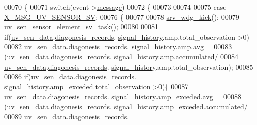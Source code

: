 \begin{DoxyCode}
00070 \{
00071     \textcolor{keywordflow}{switch}(event->\hyperlink{a00036_adf9665938515a20c283eea2c978cf80d}{message})
00072     \{
00073 
00074 
00075         \textcolor{keywordflow}{case} \hyperlink{a00035_a88ce8cfec1a4d1cf613a890254880e24}{X\_MSG\_UV\_SENSOR\_SV}:
00076         \{
00077 
00078             \hyperlink{a00067_a710d148845397582739d170341f3d3d9}{srv\_wdg\_kick}();
00079             uv\_sen\_sensor\_element\_sv\_task();
00080 
00081             \textcolor{keywordflow}{if}(\hyperlink{a00073_adb4cffe9b88704fe686a94fe9996fa52}{uv\_sen\_data}.\hyperlink{a00035_a7ae905b560513ad201e58c2f63375030}{diagonesis\_records}.
      \hyperlink{a00017_affb63906d23cb1cb7787d61eaaedfb60}{signal\_history}.amp.total\_observation >0)
00082                 \hyperlink{a00073_adb4cffe9b88704fe686a94fe9996fa52}{uv\_sen\_data}.\hyperlink{a00035_a7ae905b560513ad201e58c2f63375030}{diagonesis\_records}.
      \hyperlink{a00017_affb63906d23cb1cb7787d61eaaedfb60}{signal\_history}.amp.avg =
00083                         (\hyperlink{a00073_adb4cffe9b88704fe686a94fe9996fa52}{uv\_sen\_data}.\hyperlink{a00035_a7ae905b560513ad201e58c2f63375030}{diagonesis\_records}.
      \hyperlink{a00017_affb63906d23cb1cb7787d61eaaedfb60}{signal\_history}.amp.accumulated/
00084                         \hyperlink{a00073_adb4cffe9b88704fe686a94fe9996fa52}{uv\_sen\_data}.\hyperlink{a00035_a7ae905b560513ad201e58c2f63375030}{diagonesis\_records}.
      \hyperlink{a00017_affb63906d23cb1cb7787d61eaaedfb60}{signal\_history}.amp.total\_observation);
00085 
00086             \textcolor{keywordflow}{if}(\hyperlink{a00073_adb4cffe9b88704fe686a94fe9996fa52}{uv\_sen\_data}.\hyperlink{a00035_a7ae905b560513ad201e58c2f63375030}{diagonesis\_records}.
      \hyperlink{a00017_affb63906d23cb1cb7787d61eaaedfb60}{signal\_history}.amp\_exceded.total\_observation >0)\{
00087                 \hyperlink{a00073_adb4cffe9b88704fe686a94fe9996fa52}{uv\_sen\_data}.\hyperlink{a00035_a7ae905b560513ad201e58c2f63375030}{diagonesis\_records}.
      \hyperlink{a00017_affb63906d23cb1cb7787d61eaaedfb60}{signal\_history}.amp\_exceded.avg =
00088                         (\hyperlink{a00073_adb4cffe9b88704fe686a94fe9996fa52}{uv\_sen\_data}.\hyperlink{a00035_a7ae905b560513ad201e58c2f63375030}{diagonesis\_records}.
      \hyperlink{a00017_affb63906d23cb1cb7787d61eaaedfb60}{signal\_history}.amp\_exceded.accumulated/
00089                         \hyperlink{a00073_adb4cffe9b88704fe686a94fe9996fa52}{uv\_sen\_data}.\hyperlink{a00035_a7ae905b560513ad201e58c2f63375030}{diagonesis\_records}.

\end{DoxyCode}
